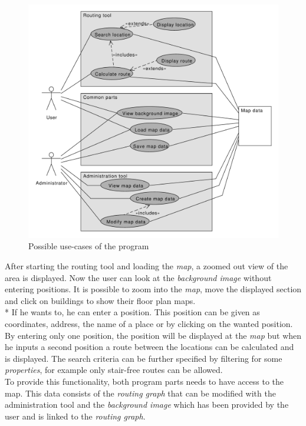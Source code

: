 \begin{figure}[h]
	\centering
	\includegraphics[scale=0.5]{diagrams/usecase.pdf}
	\caption{Possible use-cases of the program}
\end{figure}

After starting the routing tool and loading the \textit{map}, a zoomed out view of the area is displayed. Now the user can look at the \textit{background image} without entering positions. It is possible to zoom into the \textit{map}, move the displayed section and click on buildings to show their floor plan maps. \\*
If he wants to, he can enter a position. This position can be given as coordinates, address, the name of a place or by clicking on the wanted position. By entering only one position, the position will be displayed at the \textit{map} but when he inputs a second position a route between the locations can be calculated and is displayed. The search criteria can be further specified by filtering for some \textit{properties}, for example only stair-free routes can be allowed. \\

To provide this functionality, both program parts needs to have access to the map. This data consists of the \textit{routing graph} that can be modified with the administration tool and the \textit{background image} which has been provided by the user and is linked to the \textit{routing graph}.

